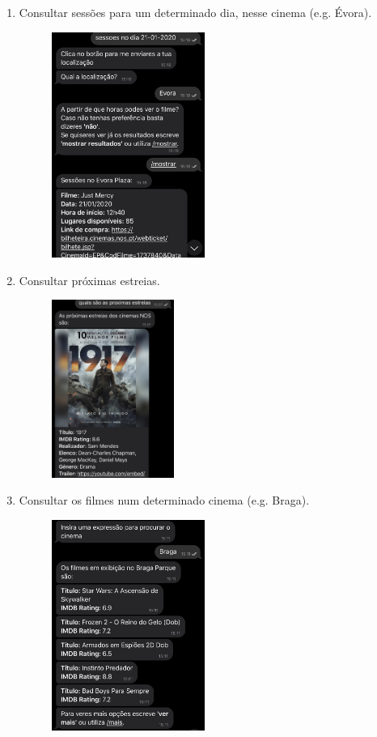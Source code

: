 \documentclass[11pt, a4paper]{article}
\begin{document}
\begin{appendices}
\begin{enumerate}
    \item Consultar sessões para um determinado dia, nesse cinema (e.g. Évora).
    \begin{figure}[H]
        \centering
        \includegraphics[width=5cm]{images/guiaoR/4.jpg}
    \end{figure}
    \item Consultar próximas estreias.
    \begin{figure}[H]
        \centering
        \includegraphics[width=4cm]{images/guiaoR/5.jpg}
    \end{figure}
    \item Consultar os filmes num determinado cinema (e.g. Braga).
    \begin{figure}[H]
        \centering
        \includegraphics[width=5cm]{images/guiaoR/6.jpg}

\end{figure}
\end{enumerate}
\end{appendices}
\end{document}
